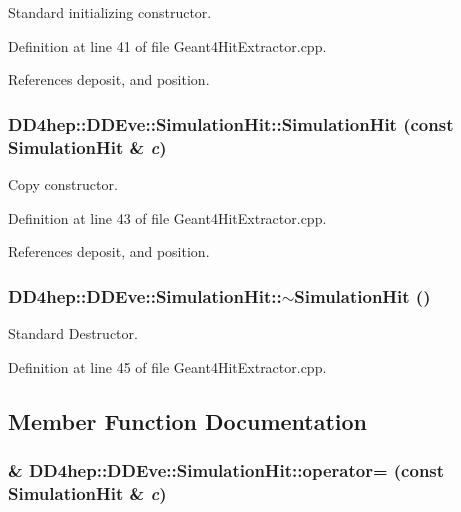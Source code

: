 Standard initializing constructor. 

Definition at line 41 of file Geant4HitExtractor.cpp.

References deposit, and position.\hypertarget{class_d_d4hep_1_1_d_d_eve_1_1_simulation_hit_a611310f4056789d4f00b19755f46636b}{
\subsubsection[{SimulationHit}]{\setlength{\rightskip}{0pt plus 5cm}DD4hep::DDEve::SimulationHit::SimulationHit (const {\bf SimulationHit} \& {\em c})}}
\label{class_d_d4hep_1_1_d_d_eve_1_1_simulation_hit_a611310f4056789d4f00b19755f46636b}


Copy constructor. 

Definition at line 43 of file Geant4HitExtractor.cpp.

References deposit, and position.\hypertarget{class_d_d4hep_1_1_d_d_eve_1_1_simulation_hit_affeb47d7d697a8aa4823c6e839e4a8d6}{
\subsubsection[{$\sim$SimulationHit}]{\setlength{\rightskip}{0pt plus 5cm}DD4hep::DDEve::SimulationHit::$\sim$SimulationHit ()}}
\label{class_d_d4hep_1_1_d_d_eve_1_1_simulation_hit_affeb47d7d697a8aa4823c6e839e4a8d6}


Standard Destructor. 

Definition at line 45 of file Geant4HitExtractor.cpp.

\subsection{Member Function Documentation}
\hypertarget{class_d_d4hep_1_1_d_d_eve_1_1_simulation_hit_a12089779b1b39ae8803dec22e1f0271e}{
\subsubsection[{operator=}]{\& DD4hep::DDEve::SimulationHit::operator= (const {\bf SimulationHit} \& {\em c})}}
\label{class_d_d4hep_1_1_d_d_eve_1_1_simulation_hit_a12089779b1b39ae8803dec22e1f0271e}


